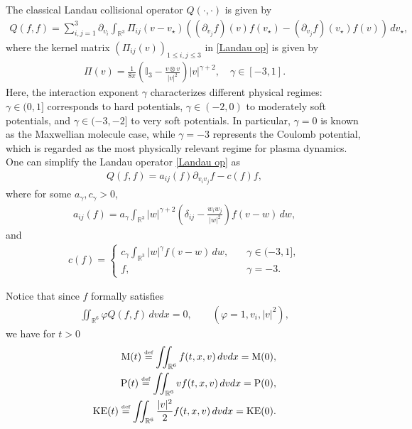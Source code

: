 \documentclass[reqno,11pt,final]{amsart}
\theoremstyle{plain}
\numberwithin{equation}{section}
\numberwithin{theorem}{section}
\newcommand{\eqdef }{\overset{\mbox{\tiny{def}}}{=}}
\begin{document}
The classical Landau collisional operator $Q(\cdot,\cdot)$ is given by
\begin{align}\label{Landau op}
    Q(f,f) = \sum_{i,j=1}^3\partial_{v_i}\int_{\mathbb{R}^3} \Pi_{ij}(v-v_\star)\left((\partial_{v_j}f)(v)f(v_\star) - (\partial_{v_j}f)(v_\star)f(v)\right)\,dv_\star,
\end{align}where the kernel matrix $(\Pi_{ij}(v))_{1\le i,j\le3}$ in \eqref{Landau op} is given by
\begin{align}\label{kernel}
    \Pi(v) = \frac{1}{8\pi} \left(\mathbb{I}_3 -\frac{v\otimes v}{|v|^2}\right)|v|^{\gamma+2}, \quad \gamma\in[-3,1].
\end{align}Here, the interaction exponent $\gamma$ characterizes different physical regimes: 
$\gamma \in (0,1]$ corresponds to hard potentials, 
$\gamma \in (-2,0)$ to moderately soft potentials, 
and $\gamma \in (-3,-2]$ to very soft potentials. 
In particular, $\gamma = 0$ is known as the Maxwellian molecule case, 
while $\gamma = -3$ represents the Coulomb potential, 
which is regarded as the most physically relevant regime for plasma dynamics. One can simplify the Landau operator \eqref{Landau op} as
\begin{align*}
    Q(f,f) = a_{ij}(f)\partial_{v_iv_j}f - c(f)f,
\end{align*}where for some $a_\gamma, c_\gamma>0$,
\begin{align}\label{leading coeff}
    a_{ij}(f) = a_\gamma\int_{\mathbb{R}^3} |w|^{\gamma+2}\left(\delta_{ij} - \frac{w_iw_j}{|w|^2}\right)f(v-w)\,dw,
\end{align}and
\begin{align*}
    c(f) =
    \begin{cases}
    c_{\gamma} \int_{\mathbb{R}^3} |w|^\gamma f(v-w)\,dw, \quad &\gamma\in(-3,1],\\
    f, &\gamma = -3.
    \end{cases}
\end{align*}

Notice that since $f$ formally satisfies
\begin{align*}
    \iint_{\mathbb{R}^6} \varphi Q(f,f)\,dvdx = 0, \qquad (\varphi = 1,v_i, |v|^2),
\end{align*}we have for $t>0$
\begin{align}\label{Landau mass cons}
    \textup{M}(t)\eqdef \iint_{\mathbb{R}^6} f(t,x,v)\,dvdx = \textup{M}(0),\\ \label{Landau momentum cons}
    \textup{P}(t) \eqdef \iint_{\mathbb{R}^6} vf(t,x,v)\,dvdx = \textup{P}(0),\\ \label{Landau energy cons}
    \textup{KE}(t) \eqdef \iint_{\mathbb{R}^6} \frac{|v|^2}{2}f(t,x,v)\,dvdx = \textup{KE}(0).
\end{align}
\end{document}

